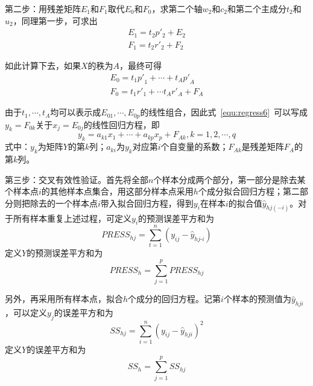 第二步：用残差矩阵$E_1$和$F_1$取代$E_0$和$F_0$，求第二个轴$w_2$和$c_2$和第二个主成分$t_2$和$u_2$，同理第一步，可求出
\begin{align}
    \label{equ:regress3}
    E_1={t_2}{p'_2}+E_2 \\
    \label{equ:regress4}
    F_1={t_2}{r'_2}+F_2
\end{align}

如此计算下去，如果$X$的秩为$A$，最终可得
\begin{align}
    \label{equ:regress5}
    {{E}_{0}}={{t}_{1}}{{{p}'}_{1}}+\cdots +{{t}_{A}}{{{p}'}_{A}} \\
    \label{equ:regress6}
    {{F}_{0}}={{t}_{1}}{{{r}'}_{1}}+\cdots {{t}_{A}}{{{r}'}_{A}}+{{F}_{A}}
\end{align}

由于$t_1,\cdots ,t_A$均可以表示成${E}_{01},\cdots ,{E}_{0p}$的线性组合，因此式~\ref{equ:regress6}~可以写成$y_k=F_{0k}$关于$x_j=E_{0j}$的线性回归方程，即
\begin{equation}
    \label{equ:regress7}
    {{y}_{k}}={{a}_{k1}}{{x}_{1}}+\cdots +{{a}_{kp}}{{x}_{p}}+{{F}_{Ak}},k=1,2,\cdots ,q
\end{equation}
式中：$y_k$为矩阵$Y$的第$k$列；$a_{ki}$为$y_k$对应第$i$个自变量的系数；${F}_{Ak}$是残差矩阵$F_A$的第$k$列。

第三步：交叉有效性验证。首先将全部$n$个样本分成两个部分，第一部分是除去某个样本点$i$的其他样本点集合，用这部分样本点采用$h$个成分拟合回归方程；第二部分则把除去的一个样本点$i$带入拟合回归方程，得到$y_i$在样本$i$的拟合值${{\hat{y}}_{hj(-i)}}$。对于所有样本重复上述过程，可定义$y_i$的预测误差平方和为
\begin{equation}
    \label{equ:press}
    {PRESS_{hj}}=\sum\limits_{t=1}^{n}{\left( {{y}_{ij}}-{{{\hat{y}}}_{hj\text{-}i}} \right)}
\end{equation}
定义$Y$的预测误差平方和为
\begin{equation}
    {{PRESS}_{h}}=\sum\limits_{j=1}^{p}{{{PRESS}_{hj}}}
\end{equation}

另外，再采用所有样本点，拟合$h$个成分的回归方程。记第$i$个样本的预测值为${{\hat{y}}_{hji}}$，可以定义$y_j$的误差平方和为
\begin{equation}
    S{{S}_{hj}}=\sum\limits_{i=1}^{n}{{{\left( {{y}_{ij}}-\hat{y}_{hji} \right)}^{2}}}
\end{equation}
定义$Y$的误差平方和为
\begin{equation}
    S{{S}_{h}}=\sum\limits_{j=1}^{p}{S{{S}_{hj}}}
\end{equation}

